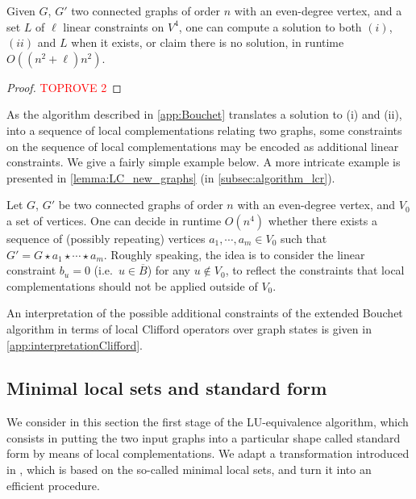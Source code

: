 \documentclass[a4paper,UKenglish,cleveref,autoref,thm-restate]{arxiv}
\begin{document}
\begin{proposition}\label{prop:extendedBouchet}
Given $G$, $G'$ two connected graphs of order $n$ with an even-degree vertex, and a set $L$ of $\ell$ linear constraints on $V^4$, one can compute a solution to both $(i)$, $(ii)$ and $L$ when it exists, or claim there is no solution, in runtime $O((n^2+\ell)n^2)$.
\end{proposition}

\begin{proof}\textcolor{red}{TOPROVE 2}\end{proof}


As the algorithm described in \cref{app:Bouchet} translates a solution to (i) and (ii), into a sequence of local complementations relating two graphs, some constraints on the sequence of local complementations may be encoded as additional linear constraints. We give a fairly simple example below. A more intricate example is presented in \cref{lemma:LC_new_graphs} (in \cref{subsec:algorithm_lcr}).

\begin{example} \label{ex:V0}
    Let $G$, $G'$ be two connected graphs of order $n$ with an even-degree vertex, and $V_0$ a set of vertices. One can decide in runtime $O(n^4)$ whether there exists a sequence of (possibly repeating) vertices $a_1, \cdots, a_m\in V_0 $ such that $G' = G \star a_1 \star \cdots \star a_m$. Roughly speaking, the idea is to consider the linear constraint $b_u=0$ (i.e.~$u\in   \overline B$) for any $u\notin V_0$, to reflect the constraints that local complementations should not be applied outside of $V_0$.
\end{example}

An interpretation of the possible additional constraints of the extended Bouchet algorithm in terms of local Clifford operators over graph states is given in \cref{app:interpretationClifford}.

\subsection{Minimal local sets and standard form} \label{subsec:mls}

We consider in this section the first stage of the LU-equivalence algorithm, which consists in putting the two input graphs into a particular shape called standard form by means of local complementations. We adapt a transformation introduced in \cite{claudet2024local}, which is based on the so-called minimal local sets, 
and turn it into an efficient procedure. 
\end{document}
